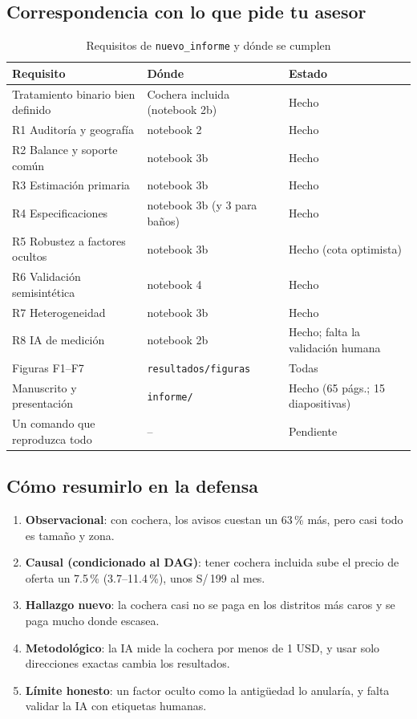 \documentclass[11pt,a4paper]{article}
\begin{document}
\subsection{Correspondencia con lo que pide tu asesor}

\begin{table}[H]\small
\caption{Requisitos de \texttt{nuevo\_informe} y dónde se cumplen}
\begin{tabularx}{\textwidth}{>{\raggedright\arraybackslash}p{4.6cm}>{\raggedright\arraybackslash}p{4.4cm}L}
\toprule
Requisito & Dónde & Estado \\
\midrule
Tratamiento binario bien definido & Cochera incluida (notebook 2b) & Hecho \\
R1 Auditoría y geografía & notebook 2 & Hecho \\
R2 Balance y soporte común & notebook 3b & Hecho \\
R3 Estimación primaria & notebook 3b & Hecho \\
R4 Especificaciones & notebook 3b (y 3 para baños) & Hecho \\
R5 Robustez a factores ocultos & notebook 3b & Hecho (cota optimista) \\
R6 Validación semisintética & notebook 4 & Hecho \\
R7 Heterogeneidad & notebook 3b & Hecho \\
R8 IA de medición & notebook 2b & Hecho; falta la validación humana \\
Figuras F1--F7 & \texttt{resultados/figuras} & Todas \\
Manuscrito y presentación & \texttt{informe/} & Hecho (65 págs.; 15 diapositivas) \\
Un comando que reproduzca todo & -- & Pendiente \\
\bottomrule
\end{tabularx}
\end{table}

\subsection{Cómo resumirlo en la defensa}

\begin{enumerate}
\item \textbf{Observacional}: con cochera, los avisos cuestan un 63\,\% más, pero casi todo es tamaño y zona.
\item \textbf{Causal (condicionado al DAG)}: tener cochera incluida sube el precio de oferta un 7.5\,\% (3.7--11.4\,\%), unos S/\,199 al mes.
\item \textbf{Hallazgo nuevo}: la cochera casi no se paga en los distritos más caros y se paga mucho donde escasea.
\item \textbf{Metodológico}: la IA mide la cochera por menos de 1 USD, y usar solo direcciones exactas cambia los resultados.
\item \textbf{Límite honesto}: un factor oculto como la antigüedad lo anularía, y falta validar la IA con etiquetas humanas.
\end{enumerate}
\end{document}
